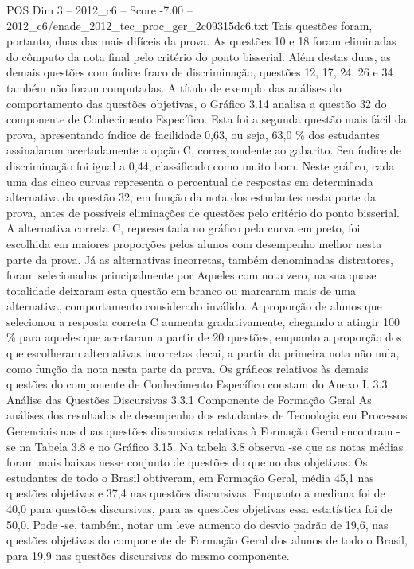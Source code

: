 \begin{textsample}{POS Dim 3 – 2012\_c6 – Score -7.00 – 2012\_c6/enade\_2012\_tec\_proc\_ger\_2c09315dc6.txt}
Tais questões foram, portanto, duas das mais difíceis da prova.
As questões 10 e 18 foram eliminadas do cômputo da nota final pelo critério do ponto bisserial.
Além destas duas, as demais questões com índice fraco de discriminação, questões 12, 17, 24, 26 e 34 também não foram computadas.
A título de exemplo das análises do comportamento das questões objetivas, o Gráfico 3.14 analisa a questão 32 do componente de Conhecimento Específico.
Esta foi a segunda questão mais fácil da prova, apresentando índice de facilidade 0,63, ou seja, 63,0 \% dos estudantes assinalaram acertadamente a opção C, correspondente ao gabarito.
Seu índice de discriminação foi igual a 0,44, classificado como muito bom.
Neste gráfico, cada uma das cinco curvas representa o percentual de respostas em determinada alternativa da questão 32, em função da nota dos estudantes nesta parte da prova, antes de possíveis eliminações de questões pelo critério do ponto bisserial.
A alternativa correta C, representada no gráfico pela curva em preto, foi escolhida em maiores proporções pelos alunos com desempenho melhor nesta parte da prova.
Já as alternativas incorretas, também denominadas distratores, foram selecionadas principalmente por Aqueles com nota zero, na sua quase totalidade deixaram esta questão em branco ou marcaram mais de uma alternativa, comportamento considerado inválido.
A proporção de alunos que selecionou a resposta correta C aumenta gradativamente, chegando a atingir 100 \% para aqueles que acertaram a partir de 20 questões, enquanto a proporção dos que escolheram alternativas incorretas decai, a partir da primeira nota não nula, como função da nota nesta parte da prova.
Os gráficos relativos às demais questões do componente de Conhecimento Específico constam do Anexo I. 3.3 Análise das Questões Discursivas 3.3.1 Componente de Formação Geral As análises dos resultados de desempenho dos estudantes de Tecnologia em Processos Gerenciais nas duas questões discursivas relativas à Formação Geral encontram -se na Tabela 3.8 e no Gráfico 3.15.
Na tabela 3.8 observa -se que as notas médias foram mais baixas nesse conjunto de questões do que no das objetivas.
Os estudantes de todo o Brasil obtiveram, em Formação Geral, média 45,1 nas questões objetivas e 37,4 nas questões discursivas.
Enquanto a mediana foi de 40,0 para questões discursivas, para as questões objetivas essa estatística foi de 50,0.
Pode -se, também, notar um leve aumento do desvio padrão de 19,6, nas questões objetivas do componente de Formação Geral dos alunos de todo o Brasil, para 19,9 nas questões discursivas do mesmo componente.

\end{textsample}
